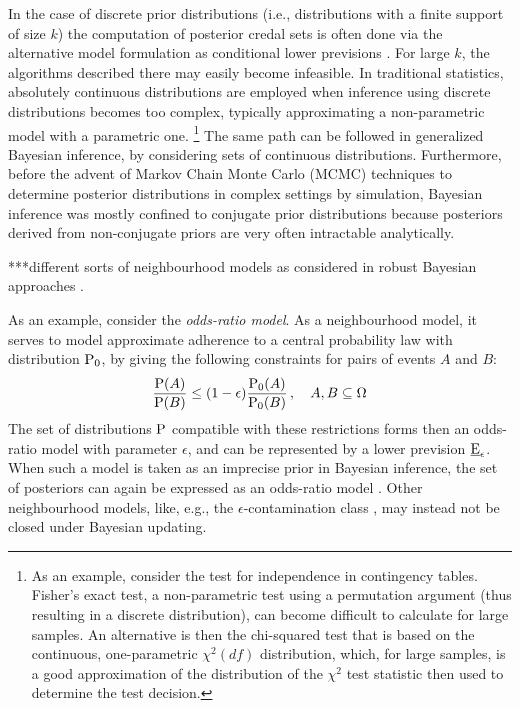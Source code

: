 In the case of discrete prior distributions (i.e., distributions with a finite support of size $k$)
the computation of posterior credal sets is often done
via the alternative model formulation as conditional lower previsions
\parencite[see, e.g.,][]{itip-computation}.
For large $k$, the algorithms described there may easily become infeasible.
In traditional statistics, absolutely continuous distributions are employed
when inference using discrete distributions becomes too complex,
typically approximating a non-parametric model with a parametric one.%
\footnote{As an example, consider the test for independence in contingency tables.
Fisher's exact test, a non-parametric test using a permutation argument (thus resulting in a discrete distribution),
can become difficult to calculate for large samples.
An alternative is then the chi-squared test that is based on the continuous, one-parametric $\chi^2(df)$ distribution,
which, for large samples, is a good approximation of the distribution of the $\chi^2$ test statistic then used to determine the test decision.}
The same path can be followed in generalized Bayesian inference,
by considering sets of continuous distributions.
Furthermore, before the advent of Markov Chain Monte Carlo (MCMC) techniques \parencite[see, e.g.,][]{1998:gilks}
to determine posterior distributions in complex settings by simulation,
Bayesian inference was mostly confined to conjugate prior distributions
because posteriors derived from non-conjugate priors are very often intractable analytically.

\bigskip

***different sorts of neighbourhood models as considered in robust Bayesian approaches \parencite[e.g.,][]{1994:berger}.


As an example, consider the \emph{odds-ratio model}.
As a neighbourhood model,
it serves to model approximate adherence to a central probability law with distribution $\operatorname{P}_0$,
by giving the following constraints for pairs of events $A$ and $B$:
\begin{align*}
\frac{\operatorname{P}(A)}{\operatorname{P}(B)} \le (1-\epsilon)\frac{\operatorname{P}_0(A)}{\operatorname{P}_0(B)}\,,\quad A, B \subseteq \Omega
\end{align*}
The set of distributions $\operatorname{P}$ compatible with these restrictions
forms then an odds-ratio model with parameter $\epsilon$,
and can be represented by a lower prevision $\underline{\operatorname{E}}_\epsilon$.
When such a model is taken as an imprecise prior in Bayesian inference,
the set of posteriors can again be expressed as an odds-ratio model
\parencite[\S 7.2]{itip-special}.
Other neighbourhood models, like, e.g., the $\epsilon$-contamination class
\parencite[see, e.g.,][\S 4.3.2]{1994:berger},
may instead not be closed under Bayesian updating.

